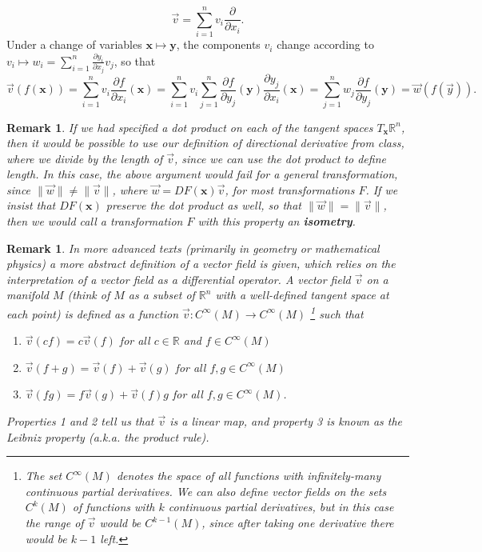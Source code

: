 \documentclass[12pt,letterpaper]{article}
\newtheorem{rem}[theorem]{Remark}
\newenvironment{remark}{\begin{rem}\rm}{\end{rem}}
\newcommand{\R}{\mathbb{R}}
\newcommand{\x}{\mathbf{x}}
\newcommand{\y}{\mathbf{y}}
\begin{document}
\[
 \vec{v} = \sum_{i=1}^n v_i\frac{\partial}{\partial x_i}.
\]
Under a change of variables $\x\mapsto \y$, the components $v_i$ change according to $\displaystyle v_i\mapsto w_i = \sum_{i=1}^n\frac{\partial y_i}{\partial x_j}v_j$, so that
\[
 \vec{v}(f(\x)) = \sum_{i=1}^n v_i\frac{\partial f}{\partial x_i}(\x) = \sum_{i=1}^n v_i\sum_{j=1}^n \frac{\partial f}{\partial y_j}(\y)\frac{\partial y_j}{\partial x_i}(\x) = \sum_{j=1}^n w_j\frac{\partial f}{\partial y_j}(\y) = \vec{w}(f(\vec{y})).
\]
\begin{remark}
If we had specified a dot product on each of the tangent spaces $T_\x\R^n$, then it would be possible to use our definition of directional derivative from class, where we divide by the length of $\vec{v}$, since we can use the dot product to define length. In this case, the above argument would fail for a general transformation, since $\lVert \vec{w}\rVert \neq \lVert \vec{v}\rVert$, where $\vec{w} = DF(\x)\vec{v}$, for most transformations $F$. If we insist that $DF(\x)$ preserve the dot product as well, so that $\lVert \vec{w}\rVert = \lVert \vec{v}\rVert$, then we would call a transformation $F$ with this property an {\bf isometry}.
\end{remark}
\begin{remark}
In more advanced texts (primarily in geometry or mathematical physics) a more abstract definition of a vector field is given, which relies on the interpretation of a vector field as a differential operator. A vector field $\vec{v}$ on a manifold $M$ (think of $M$ as a subset of $\R^n$ with a well-defined tangent space at each point) is {\em defined} as a function $\vec{v}:C^\infty(M)\to C^\infty(M)$ \footnote{The set $C^\infty(M)$ denotes the space of all functions with infinitely-many continuous partial derivatives. We can also define vector fields on the sets $C^k(M)$ of functions with $k$ continuous partial derivatives, but in this case the range of $\vec{v}$ would be $C^{k-1}(M)$, since after taking one derivative there would be $k-1$ left.} such that
\begin{enumerate}
\item $\vec{v}(cf) = c\vec{v}(f)$ for all $c\in \R$ and $f\in C^\infty(M)$
\item $\vec{v}(f+g) = \vec{v}(f)+\vec{v}(g)$ for all $f,g\in C^\infty(M)$
\item $\vec{v}(fg) = f\vec{v}(g)+ \vec{v}(f)g$ for all $f,g\in C^\infty(M)$.
\end{enumerate}
Properties 1 and 2 tell us that $\vec{v}$ is a linear map, and property 3 is known as the Leibniz property (a.k.a. the product rule).
\end{remark}
\end{document}
